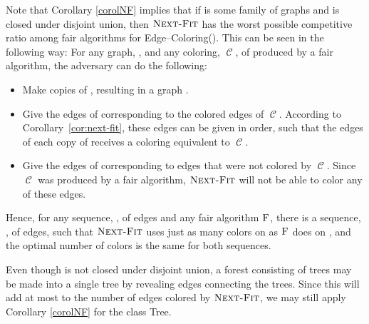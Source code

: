 \documentclass[smallextended]{svjour3}
\newcommand{\mcarg}[1]{{\sc Edge--Coloring(#1)}\xspace}
\newcommand{\coloring}{\ensuremath{\operatorname{\mathscr{C}}}\xspace}
\newcommand{\NF}{\ensuremath{\operatorname{\textsc{Next-Fit}}}\xspace}
\newcommand{\FAIR}{\ensuremath{\operatorname{\textsc{F}}}\xspace}
\begin{document}
Note that Corollary \ref{corolNF} implies that if  is
some family of graphs and  is closed under disjoint
union, then \NF has the worst possible competitive ratio among fair
algorithms for \mcarg{}. 
This can be seen in the following way:
For any graph, , and any coloring, \coloring, of  produced by a
 fair algorithm, the adversary can do the following:
\begin{itemize}
\item Make  copies of , resulting in a graph .
\item Give the edges of  corresponding to the colored edges of \coloring.
 According to Corollary~\ref{cor:next-fit}, these edges can be given in order, such that the edges of each copy of  receives a coloring equivalent to \coloring.
\item Give the edges of  corresponding to edges that were not colored by \coloring.
 Since \coloring was produced by a fair algorithm, \NF will not be able to color any of these edges.
\end{itemize}
Hence, for any sequence, , of edges and any fair algorithm \FAIR, there is a sequence, , of edges, such that \NF uses just as many colors on  as \FAIR does on , and the optimal number of colors is the same for both sequences.

Even though  is not closed under disjoint union, a forest consisting of  trees may be made into a single tree by revealing  edges connecting the  trees. 
Since this will add at most  to the number of edges colored
by \NF, we may still apply Corollary \ref{corolNF} for the class {\sc Tree}.
\end{document}
